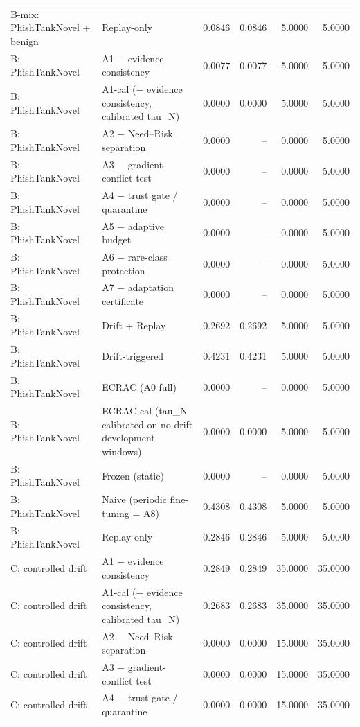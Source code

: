 \begin{table}[t]
\begin{tabular}{llrrrr}
B-mix: PhishTankNovel + benign & Replay-only & 0.0846 & 0.0846 & 5.0000 & 5.0000 \\
B: PhishTankNovel & A1 − evidence consistency & 0.0077 & 0.0077 & 5.0000 & 5.0000 \\
B: PhishTankNovel & A1-cal (− evidence consistency, calibrated tau\_N) & 0.0000 & 0.0000 & 5.0000 & 5.0000 \\
B: PhishTankNovel & A2 − Need–Risk separation & 0.0000 & -- & 0.0000 & 5.0000 \\
B: PhishTankNovel & A3 − gradient-conflict test & 0.0000 & -- & 0.0000 & 5.0000 \\
B: PhishTankNovel & A4 − trust gate / quarantine & 0.0000 & -- & 0.0000 & 5.0000 \\
B: PhishTankNovel & A5 − adaptive budget & 0.0000 & -- & 0.0000 & 5.0000 \\
B: PhishTankNovel & A6 − rare-class protection & 0.0000 & -- & 0.0000 & 5.0000 \\
B: PhishTankNovel & A7 − adaptation certificate & 0.0000 & -- & 0.0000 & 5.0000 \\
B: PhishTankNovel & Drift + Replay & 0.2692 & 0.2692 & 5.0000 & 5.0000 \\
B: PhishTankNovel & Drift-triggered & 0.4231 & 0.4231 & 5.0000 & 5.0000 \\
B: PhishTankNovel & ECRAC (A0 full) & 0.0000 & -- & 0.0000 & 5.0000 \\
B: PhishTankNovel & ECRAC-cal (tau\_N calibrated on no-drift development windows) & 0.0000 & 0.0000 & 5.0000 & 5.0000 \\
B: PhishTankNovel & Frozen (static) & 0.0000 & -- & 0.0000 & 5.0000 \\
B: PhishTankNovel & Naive (periodic fine-tuning = A8) & 0.4308 & 0.4308 & 5.0000 & 5.0000 \\
B: PhishTankNovel & Replay-only & 0.2846 & 0.2846 & 5.0000 & 5.0000 \\
C: controlled drift & A1 − evidence consistency & 0.2849 & 0.2849 & 35.0000 & 35.0000 \\
C: controlled drift & A1-cal (− evidence consistency, calibrated tau\_N) & 0.2683 & 0.2683 & 35.0000 & 35.0000 \\
C: controlled drift & A2 − Need–Risk separation & 0.0000 & 0.0000 & 15.0000 & 35.0000 \\
C: controlled drift & A3 − gradient-conflict test & 0.0000 & 0.0000 & 15.0000 & 35.0000 \\
C: controlled drift & A4 − trust gate / quarantine & 0.0000 & 0.0000 & 15.0000 & 35.0000 \\

\end{tabular}
\end{table}
